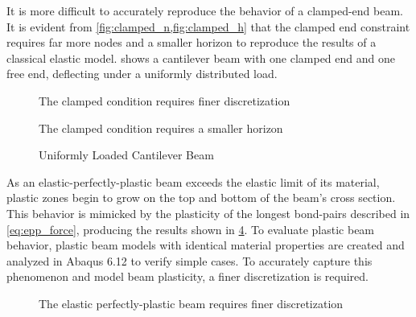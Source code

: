 It is more difficult to accurately reproduce the behavior of a clamped-end beam.
It is evident from \cref{fig:clamped_n,fig:clamped_h} that the clamped end constraint requires far more nodes and a smaller horizon to reproduce the results of a classical elastic model.
 shows a cantilever beam with one clamped end and one free end, deflecting under a uniformly distributed load.
%
\begin{figure}[htbp]
  \centering
  \resizebox{0.6\linewidth}{!}{}
  \caption{The clamped condition requires finer discretization}
  \label{fig:clamped_n}
\end{figure}
%
%
\begin{figure}[htbp]
  \centering
  \resizebox{0.6\linewidth}{!}{}
  \caption{The clamped condition requires a smaller horizon}
  \label{fig:clamped_h}
\end{figure}
%
%
\begin{figure}[htbp]
  \centering
  \resizebox{0.6\linewidth}{!}{}
  \caption{Uniformly Loaded Cantilever Beam}
  \label{fig:cantilever_n}
\end{figure}
%

As an elastic-perfectly-plastic beam exceeds the elastic limit of its material, plastic zones begin to grow on the top and bottom of the beam's cross section.
This behavior is mimicked by the plasticity of the longest bond-pairs described in \cref{eq:epp_force}, producing the results shown in \cref{fig:eppu_h10_g2000}.
To evaluate plastic beam behavior, plastic beam models with identical material properties are created and analyzed in Abaqus 6.12 to verify simple cases.
To accurately capture this phenomenon and model beam plasticity, a finer discretization is required.
\begin{figure}[h]
  \centering
  \resizebox{0.6\linewidth}{!}{}
  \caption{The elastic perfectly-plastic beam requires finer discretization}
  \label{fig:eppu_h10_g2000}
\end{figure}

